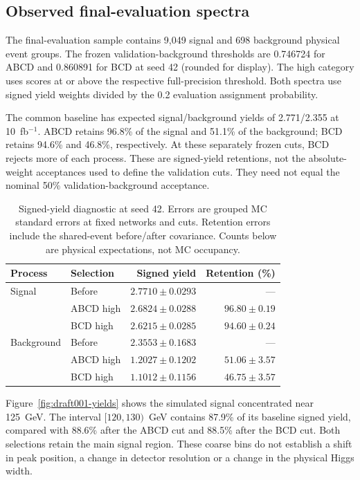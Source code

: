 \subsection{Observed final-evaluation spectra}

The final-evaluation sample contains 9,049 signal and 698 background physical
event groups. The frozen validation-background thresholds are 0.746724 for ABCD
and 0.860891 for BCD at seed 42 (rounded for display). The high category uses
scores at or above the respective full-precision threshold. Both spectra use
signed yield weights divided by the 0.2 evaluation assignment probability.

The common baseline has expected signal/background yields of 2.771/2.355 at
10~fb$^{-1}$. ABCD retains 96.8\% of the signal and 51.1\% of the background;
BCD retains 94.6\% and 46.8\%, respectively. At these separately frozen cuts,
BCD rejects more of each process. These are signed-yield retentions, not the
absolute-weight acceptances used to define the validation cuts. They need not
equal the nominal 50\% validation-background acceptance.

\begin{table}[tbp]
\caption{Signed-yield diagnostic at seed 42. Errors are grouped MC standard
errors at fixed networks and cuts. Retention errors include the shared-event
before/after covariance. Counts below are physical expectations, not MC occupancy.}
\label{tab:yields}
\centering
\begin{tabular}{llrr}
\toprule
Process & Selection & Signed yield & Retention (\%) \\
\midrule
Signal & Before & $2.7710\pm0.0293$ & --- \\
 & ABCD high & $2.6824\pm0.0288$ & $96.80\pm0.19$ \\
 & BCD high & $2.6215\pm0.0285$ & $94.60\pm0.24$ \\
Background & Before & $2.3553\pm0.1683$ & --- \\
 & ABCD high & $1.2027\pm0.1202$ & $51.06\pm3.57$ \\
 & BCD high & $1.1012\pm0.1156$ & $46.75\pm3.57$ \\
\bottomrule
\end{tabular}
\end{table}

Figure~\ref{fig:draft001-yields} shows the simulated signal concentrated near
125~GeV. The interval $[120,130)$~GeV contains 87.9\% of its baseline signed yield,
compared with 88.6\% after the ABCD cut and 88.5\% after the BCD cut. Both selections
retain the main signal region. These coarse bins do not establish a shift in peak
position, a change in detector resolution or a change in the physical Higgs width.

